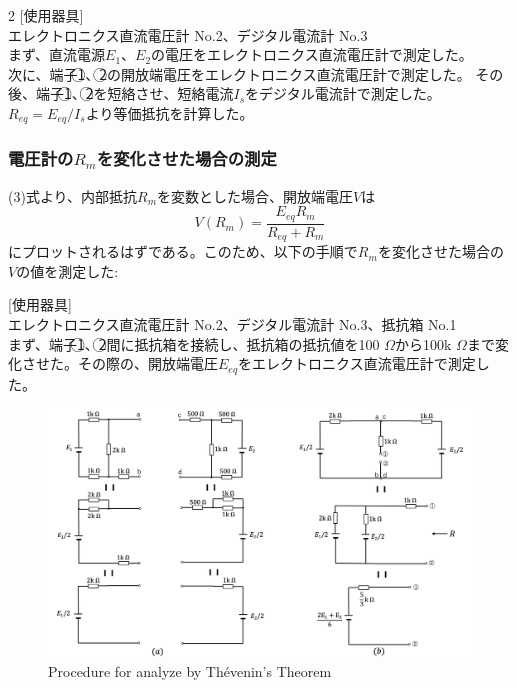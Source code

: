\documentclass[a4paper,10pt]{jsarticle}
\begin{document}
\begin{multicols}{2}
[使用器具]\\
エレクトロニクス直流電圧計 No.2、デジタル電流計 No.3\\

まず、直流電源$E_1$、$E_2$の電圧をエレクトロニクス直流電圧計で測定した。\\
次に、端子\textcircled{1}、\textcircled{2}の開放端電圧をエレクトロニクス直流電圧計で測定した。
その後、端子\textcircled{1}、\textcircled{2}を短絡させ、短絡電流$I_s$をデジタル電流計で測定した。
$R_{eq} = E_{eq}/I_s$より等価抵抗を計算した。\\
\subsubsection{電圧計の$R_m$を変化させた場合の測定}
(3)式より、内部抵抗$R_m$を変数とした場合、開放端電圧$V$は
\begin{equation}
  V(R_m) = \frac{E_{eq}R_m}{R_{eq}+R_m} 
\end{equation}
にプロットされるはずである。このため、以下の手順で$R_m$を変化させた場合の$V$の値を測定した:

[使用器具]\\
エレクトロニクス直流電圧計 No.2、デジタル電流計 No.3、抵抗箱 No.1\\

まず、端子\textcircled{1}、\textcircled{2}間に抵抗箱を接続し、抵抗箱の抵抗値を100 $\Omega$から100k $\Omega$まで変化させた。その際の、開放端電圧$E_{eq}$をエレクトロニクス直流電圧計で測定した。
\end{multicols}

\begin{figure}[H]
  \centering
  \includegraphics[width=0.8\linewidth]{figs/tebnan_procedure.pdf}
  \caption{Procedure for analyze by Thévenin's Theorem}
  \label{fig:tebnan_procedure}
\end{figure}

\clearpage
\end{document}
